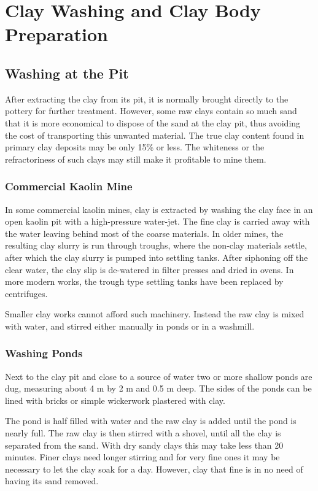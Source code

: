 \chapter{Clay Washing and Clay Body Preparation}
\section{Washing at the Pit}
After extracting the clay from its pit, it is normally brought directly to the 
pottery for further treatment. However, some raw clays contain so much sand 
that it is more economical to dispose of the sand at the clay pit, thus 
avoiding the cost of transporting this unwanted material. The true clay content 
found in primary clay deposits may be only 15\% or less. The whiteness or the 
refractoriness of such clays may still make it profitable to mine them.
\subsection{Commercial Kaolin Mine}
In some commercial kaolin mines, clay is extracted by washing the clay face in 
an open kaolin pit with a high-pressure water-jet. The fine clay is carried 
away with the water leaving behind most of the coarse materials. In older 
mines, the resulting clay slurry is run through troughs, where the non-clay 
materials settle, after which the clay slurry is pumped into settling tanks. 
After siphoning off the clear water, the clay slip is de-watered in filter 
presses and dried in ovens. In more modern works, the trough type settling 
tanks have been replaced by centrifuges.

Smaller clay works cannot afford such machinery. Instead the raw clay is mixed 
with water, and stirred either manually in ponds or in a washmill.
\subsection{Washing Ponds}
Next to the clay pit and close to a source of water two or more shallow ponds 
are dug, measuring about 4 m by 2 m and 0.5 m deep. The sides of the ponds can 
be lined with bricks or simple wickerwork plastered with clay.

The pond is half filled with water and the raw clay is added until the pond is 
nearly full. The raw clay is then stirred with a shovel, until all the clay is 
separated from the sand. With dry sandy clays this may take less than 20 
minutes. Finer clays need longer stirring and for very fine ones it may be 
necessary to let the clay soak for a day. However, clay that fine is in no need 
of having its sand removed.

